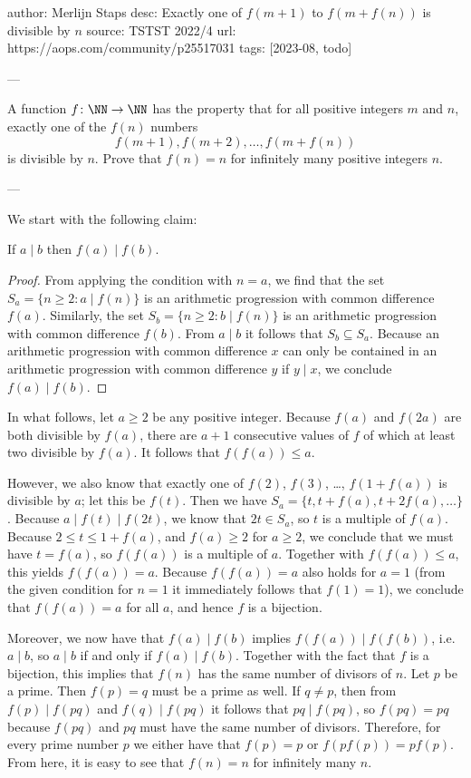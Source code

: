 author: Merlijn Staps
desc: Exactly one of $f(m+1)$ to $f(m+f(n))$ is divisible by $n$
source: TSTST 2022/4
url: https://aops.com/community/p25517031
tags: [2023-08, todo]

---

A function $f \colon \NN \to \NN$ has the property that
for all positive integers $m$ and $n$, exactly one of the $f(n)$ numbers
\[ f(m+1), f(m+2), \dots, f(m+f(n)) \]
is divisible by $n$.
Prove that $f(n)=n$ for infinitely many positive integers $n$.

---

We start with the following claim:

\begin{claim*}
  If $a \mid b$ then $f(a) \mid f(b)$.
\end{claim*}
\begin{proof}
  From applying the condition with $n=a$,
  we find that the set $S_a = \{n \ge 2: a \mid f(n)\}$
  is an arithmetic progression with common difference $f(a)$.
  Similarly, the set $S_b = \{n \ge 2: b \mid f(n)\}$
  is an arithmetic progression with common difference $f(b)$.
  From $a \mid b$ it follows that $S_b \subseteq S_a$.
  Because an arithmetic progression with common difference $x$ can only be
  contained in an arithmetic progression with common difference $y$
  if $y \mid x$, we conclude $f(a) \mid f(b)$.
\end{proof}

In what follows, let $a \ge 2$ be any positive integer.
Because $f(a)$ and $f(2a)$ are both divisible by $f(a)$,
there are $a+1$ consecutive values of $f$ of which
at least two divisible by $f(a)$. It follows that $f(f(a)) \le a$.

However, we also know that exactly one of
$f(2)$, $f(3)$, \dots, $f(1+f(a))$ is divisible by $a$; let this be $f(t)$.
Then we have $S_a = \{t, t+f(a), t+2f(a), \dots\}$.
Because $a \mid f(t) \mid f(2t)$,
we know that $2t \in S_a$, so $t$ is a multiple of $f(a)$.
Because $2 \le t \le 1+f(a)$, and $f(a) \ge 2$ for $a \ge 2$,
we conclude that we must have $t=f(a)$,
so $f(f(a))$ is a multiple of $a$.
Together with $f(f(a)) \le a$, this yields $f(f(a)) = a$.
Because $f(f(a)) = a$ also holds for $a=1$
(from the given condition for $n=1$ it immediately follows that $f(1)=1$),
we conclude that $f(f(a))=a$ for all $a$, and hence $f$ is a bijection.

Moreover, we now have that $f(a) \mid f(b)$ implies $f(f(a)) \mid f(f(b))$,
i.e.\ $a \mid b$, so $a \mid b$ if and only if $f(a) \mid f(b)$.
Together with the fact that $f$ is a bijection,
this implies that $f(n)$ has the same number of divisors of $n$.
Let $p$ be a prime. Then $f(p)=q$ must be a prime as well.
If $q \neq p$, then from $f(p) \mid f(pq)$
and $f(q) \mid f(pq)$ it follows that $pq \mid f(pq)$, so $f(pq) = pq$
because $f(pq)$ and $pq$ must have the same number of divisors.
Therefore, for every prime number $p$ we either have that $f(p)=p$
or $f(pf(p)) = pf(p)$.
From here, it is easy to see that $f(n)=n$ for infinitely many $n$.
